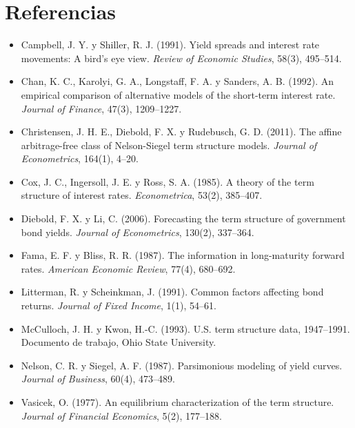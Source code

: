 \section*{Referencias}
\begin{itemize}[leftmargin=*]
  \item Campbell, J. Y. y Shiller, R. J. (1991). Yield spreads and interest rate movements: A bird's eye view. \emph{Review of
        Economic Studies}, 58(3), 495--514.
  \item Chan, K. C., Karolyi, G. A., Longstaff, F. A. y Sanders, A. B. (1992). An empirical comparison of alternative models of
        the short-term interest rate. \emph{Journal of Finance}, 47(3), 1209--1227.
  \item Christensen, J. H. E., Diebold, F. X. y Rudebusch, G. D. (2011). The affine arbitrage-free class of Nelson-Siegel term
        structure models. \emph{Journal of Econometrics}, 164(1), 4--20.
  \item Cox, J. C., Ingersoll, J. E. y Ross, S. A. (1985). A theory of the term structure of interest rates. \emph{Econometrica},
        53(2), 385--407.
  \item Diebold, F. X. y Li, C. (2006). Forecasting the term structure of government bond yields. \emph{Journal of
        Econometrics}, 130(2), 337--364.
  \item Fama, E. F. y Bliss, R. R. (1987). The information in long-maturity forward rates. \emph{American Economic Review},
        77(4), 680--692.
  \item Litterman, R. y Scheinkman, J. (1991). Common factors affecting bond returns. \emph{Journal of Fixed Income}, 1(1),
        54--61.
  \item McCulloch, J. H. y Kwon, H.-C. (1993). U.S. term structure data, 1947--1991. Documento de trabajo, Ohio State University.
  \item Nelson, C. R. y Siegel, A. F. (1987). Parsimonious modeling of yield curves. \emph{Journal of Business}, 60(4), 473--489.
  \item Vasicek, O. (1977). An equilibrium characterization of the term structure. \emph{Journal of Financial Economics}, 5(2),
        177--188.
\end{itemize}
